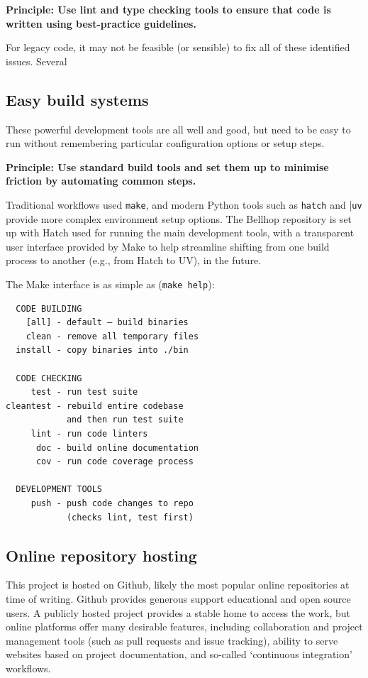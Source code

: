 \documentclass[twocolumn]{willarticle}
\newcommand\Principle[1]{\begin{framed}\bfseries Principle: #1\end{framed}}
\begin{document}
\Principle{Use lint and type checking tools to ensure that code is written using best-practice guidelines.}

For legacy code, it may not be feasible (or sensible) to fix all of these identified issues.
Several 

\subsection{Easy build systems}

These powerful development tools are all well and good, but need to be easy to run without remembering particular configuration options or setup steps.

\Principle{Use standard build tools and set them up to minimise friction by automating common steps.}

Traditional workflows used \verb|make|, and modern Python tools such as \verb|hatch| and |\verb|uv| provide more complex environment setup options.
The Bellhop repository is set up with Hatch used for running the main development tools, with a transparent user interface provided by Make to help streamline shifting from one build process to another (e.g., from Hatch to UV), in the future.

The Make interface is as simple as (\verb|make help|):
\begin{verbatim}
  CODE BUILDING
    [all] - default — build binaries
    clean - remove all temporary files
  install - copy binaries into ./bin

  CODE CHECKING
     test - run test suite
cleantest - rebuild entire codebase
            and then run test suite
     lint - run code linters
      doc - build online documentation
      cov - run code coverage process

  DEVELOPMENT TOOLS
     push - push code changes to repo
            (checks lint, test first)
\end{verbatim}

\subsection{Online repository hosting}

This project is hosted on Github, likely the most popular online repositories at time of writing.
Github provides generous support educational and open source users.
A publicly hosted project provides a stable home to access the work, but online platforms offer many desirable features, including collaboration and project management tools (such as pull requests and issue tracking), ability to serve websites based on project documentation, and so-called `continuous integration' workflows.
\end{document}
